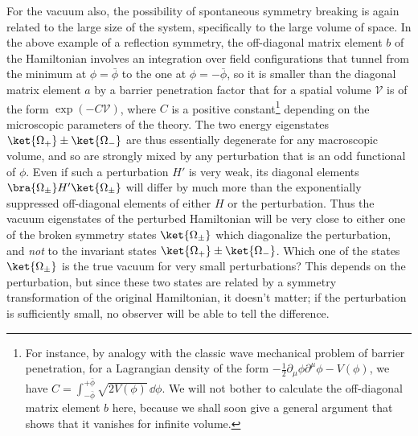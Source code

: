 For the vacuum also, the possibility of spontaneous symmetry breaking is
again related to the large size of the system, specifically to the large
volume of space. In the above example of a reflection symmetry, the
off-diagonal matrix element $b$ of the Hamiltonian involves an integration
over field configurations that tunnel from the minimum at $\phi=\bar\phi$ to
the one at $\phi=-\bar\phi$, so it is smaller than the diagonal matrix element
$a$ by a barrier penetration factor that for a spatial volume $\mathcal V$ is
of the form $\exp(-C\mathcal V)$, where $C$ is a positive
constant\footnote{For instance, by analogy with the classic wave mechanical
problem of barrier penetration, for a Lagrangian density of the form
$-\frac{1}{2}\partial_\mu\phi\partial^\mu\phi-V(\phi)$, we have
$C=\int_{-\bar\phi}^{+\bar\phi}\sqrt{2V(\phi)}\,\dd\phi$. We will not bother to
calculate the off-diagonal matrix element $b$ here, because we shall soon give
a general argument that shows that it vanishes for infinite volume.}
depending on the microscopic parameters of the theory. The two energy
eigenstates $\ket{\Omega_+}\pm\ket{\Omega_-}$ are thus essentially degenerate
for any macroscopic volume, and so are strongly mixed by any perturbation
that is an odd functional of $\phi$. Even if such a perturbation $H'$ is very
weak, its diagonal elements $\bra{\Omega_\pm}H'\ket{\Omega_\pm}$ will differ
by much more than the exponentially suppressed off-diagonal elements of
either $H$ or the perturbation. Thus the vacuum eigenstates of the perturbed
Hamiltonian will be very close to either one of the broken symmetry states
$\ket{\Omega_\pm}$ which diagonalize the perturbation, and \emph{not} to the
invariant states $\ket{\Omega_+}\pm\ket{\Omega_-}$. Which one of the states
$\ket{\Omega_\pm}$ is the true vacuum for very small perturbations? This
depends on the perturbation, but since these two states are related by a
symmetry transformation of the original Hamiltonian, it doesn't matter; if
the perturbation is sufficiently small, no observer will be able to tell the
difference.

